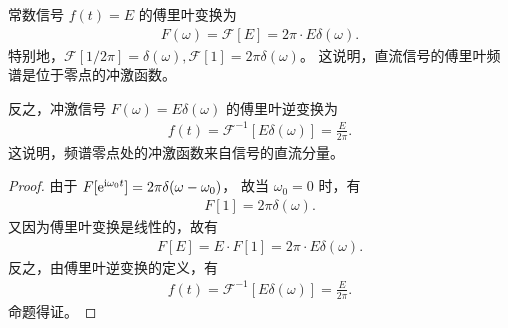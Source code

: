 \begin{theorem}[常数的傅里叶变换]
    常数信号 $f(t) = E$ 的傅里叶变换为
    \begin{align*}
        F(\omega) = \mathcal{F}[E] = 2\pi\cdot E\delta(\omega).
    \end{align*}
    特别地，$\mathcal{F}[1/2\pi] = \delta(\omega), \mathcal{F}[1] = 2\pi\delta(\omega)$。
    这说明，直流信号的傅里叶频谱是位于零点的冲激函数。

    反之，冲激信号 $F(\omega) = E\delta(\omega)$ 的傅里叶逆变换为
    \begin{align*}
        f(t) = \mathcal{F}^{-1}[E\delta(\omega)] = \frac{E}{2\pi}.
    \end{align*}
    这说明，频谱零点处的冲激函数来自信号的直流分量。
\end{theorem}

\begin{proof}
    由于 $F[\mathrm{e}^{\mathrm{i} \omega_0 t}] = 2\pi\delta(\omega - \omega_0)$，
    故当 $\omega_0 = 0$ 时，有
    \begin{align*}
        F[1] = 2\pi\delta(\omega).
    \end{align*}
    又因为傅里叶变换是线性的，故有
    \begin{align*}
        F[E] = E\cdot F[1] = 2\pi\cdot E\delta(\omega).
    \end{align*}
    反之，由傅里叶逆变换的定义，有
    \begin{align*}
        f(t) = \mathcal{F}^{-1}[E\delta(\omega)] = \frac{E}{2\pi}.
    \end{align*}
    命题得证。
\end{proof}
